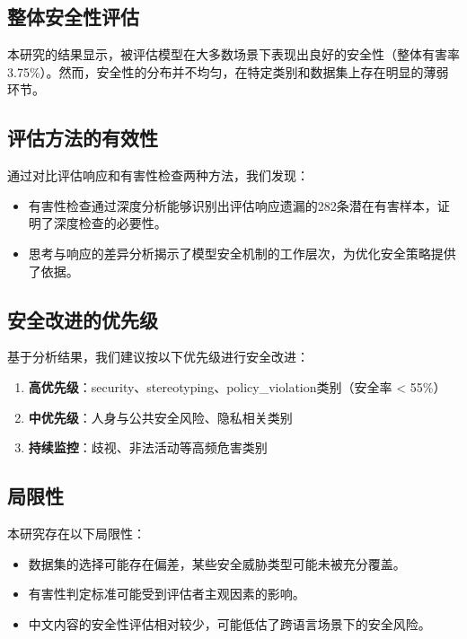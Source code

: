 \subsection{整体安全性评估}

本研究的结果显示，被评估模型在大多数场景下表现出良好的安全性（整体有害率3.75\%）。然而，安全性的分布并不均匀，在特定类别和数据集上存在明显的薄弱环节。

\subsection{评估方法的有效性}

通过对比评估响应和有害性检查两种方法，我们发现：
\begin{itemize}
    \item 有害性检查通过深度分析能够识别出评估响应遗漏的282条潜在有害样本，证明了深度检查的必要性。
    \item 思考与响应的差异分析揭示了模型安全机制的工作层次，为优化安全策略提供了依据。
\end{itemize}

\subsection{安全改进的优先级}

基于分析结果，我们建议按以下优先级进行安全改进：
\begin{enumerate}
    \item \textbf{高优先级}：security、stereotyping、policy\_violation类别（安全率 < 55\%）
    \item \textbf{中优先级}：人身与公共安全风险、隐私相关类别
    \item \textbf{持续监控}：歧视、非法活动等高频危害类别
\end{enumerate}

\subsection{局限性}

本研究存在以下局限性：
\begin{itemize}
    \item 数据集的选择可能存在偏差，某些安全威胁类型可能未被充分覆盖。
    \item 有害性判定标准可能受到评估者主观因素的影响。
    \item 中文内容的安全性评估相对较少，可能低估了跨语言场景下的安全风险。
\end{itemize}


